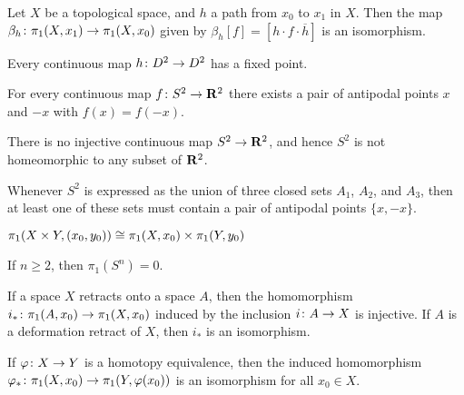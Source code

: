 \begin{proposition}
  Let $X$ be a topological space, and $h$ a path from $x_0$ to $x_1$ in $X$. Then the map $\beta_h \colon \pi_1(X,x_1) \rightarrow \pi_1(X,x_0)$ given by $\beta_h[f] = [h \cdot f \cdot \overline{h}]$ is an isomorphism.
\end{proposition}

\begin{theorem}
  Every continuous map $h \colon D^2 \rightarrow D^2$ has a fixed point.
\end{theorem}

\begin{theorem}
  For every continuous map $f \colon S^2 \rightarrow \mathbf{R}^2$ there exists a pair of antipodal points $x$ and $-x$ with $f(x) = f(-x)$.
\end{theorem}

\begin{corollary}
  There is no injective continuous map $S^2 \rightarrow \mathbf{R}^2$, and hence $S^2$ is not homeomorphic to any subset of $\mathbf{R}^2$.
\end{corollary}

\begin{corollary}
  Whenever $S^2$ is expressed as the union of three closed sets $A_1$, $A_2$, and $A_3$, then at least one of these sets must contain a pair of antipodal points $\{x,-x\}$.
\end{corollary}

\begin{proposition}
  $\pi_1(X \times Y, (x_0, y_0)) \cong \pi_1(X,x_0) \times \pi_1(Y,y_0)$
\end{proposition}

\begin{proposition}
  If $n \geq 2$, then $\pi_1(S^n) = 0$.
\end{proposition}

\begin{proposition}
  If a space $X$ retracts onto a space $A$, then the homomorphism $i_\ast \colon \pi_1(A,x_0) \rightarrow \pi_1(X,x_0)$ induced by the inclusion $i \colon A \rightarrow X$ is injective. If $A$ is a deformation retract of $X$, then $i_\ast$ is an isomorphism.
\end{proposition}

\begin{proposition}
  If $\varphi \colon X \rightarrow Y$ is a homotopy equivalence, then the induced homomorphism $\varphi_\ast \colon \pi_1(X,x_0) \rightarrow \pi_1(Y, \varphi(x_0))$ is an isomorphism for all $x_0 \in X$.
\end{proposition}

